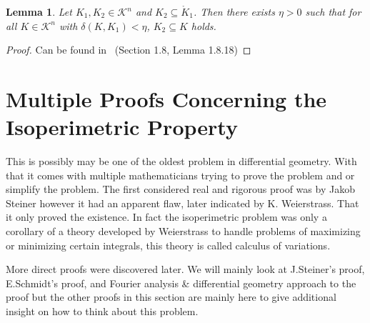 \documentclass[a4paper]{book}
\newtheorem{lemma}[theorem]{Lemma}%
\numberwithin{theorem}{section}%
\begin{document}
\begin{lemma}
    Let $K_{1},K_{2}\in\mathscr{K}^{n}$ and $K_{2}\subseteq\mathring{K}_{1}$. Then there exists $\eta>0$ such that for all $K\in\mathscr{K}^{n}$ with $\delta(K,K_{1})<\eta$, $K_{2}\subseteq K$ holds.
\end{lemma}
\begin{proof}
    Can be found in~\citep{schneider2014convex} (Section 1.8, Lemma 1.8.18)
\end{proof}


\chapter{Multiple Proofs Concerning the Isoperimetric Property}
This is possibly may be one of the oldest problem in differential geometry. With that it comes with multiple mathematicians trying to prove the problem and or simplify the problem. The first considered real and rigorous proof was by Jakob Steiner however it had an apparent flaw, later indicated by K. Weierstrass. That it only proved the existence. In fact the isoperimetric problem was only a corollary of a theory developed by Weierstrass to handle problems of maximizing or minimizing certain integrals, this theory is called calculus of variations. 

More direct proofs were discovered later. We will mainly look at J.Steiner's proof, E.Schmidt's proof, and Fourier analysis {\&} differential geometry approach to the proof but the other proofs in this section are mainly here to give additional insight on how to think about this problem. 
\end{document}

